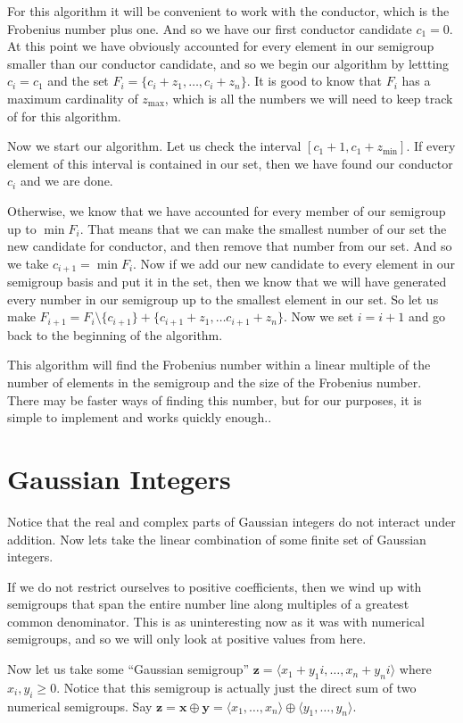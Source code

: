 \documentclass[11pt]{amsart}
\theoremstyle{plain}
\theoremstyle{definition}
\begin{document}
For this algorithm it will be convenient to work with the conductor, which is the Frobenius number plus one.
And so we have our first conductor candidate $c_1=0$.
At this point we have obviously accounted for every element in our semigroup smaller than our conductor candidate, and so we begin our algorithm by lettting $c_i=c_1$ and the set $F_i=\{c_i+z_1,\dots,c_i+z_n\}$.
It is good to know that $F_i$ has a maximum cardinality of $z_\text{max}$, which is all the numbers we will need to keep track of for this algorithm.

Now we start our algorithm.
Let us check the interval $[c_1+1,c_1+z_\text{min}]$.
If every element of this interval is contained in our set, then we have found our conductor $c_i$ and we are done.

Otherwise, we know that we have accounted for every member of our semigroup up to $\min F_i$. That means that we can make the smallest number of our set the new candidate for conductor, and then remove that number from our set. And so we take $c_{i+1}=\min F_i$. Now if we add our new candidate to every element in our semigroup basis and put it in the set, then we know that we will have generated every number in our semigroup up to the smallest element in our set. So let us make $F_{i+1}=F_i\setminus \{c_{i+1}\} + \{c_{i+1}+z_1,\dots c_{i+1}+z_n\}$. Now we set $i=i+1$ and go back to the beginning of the algorithm.

This algorithm will find the Frobenius number within a linear multiple of the number of elements in the semigroup and the size of the Frobenius number. There may be faster ways of finding this number, but for our purposes, it is simple to implement and works quickly enough.\cite{frobmask}.

\section{Gaussian Integers}
Notice that the real and complex parts of Gaussian integers do not interact under addition. Now lets take the linear combination of some finite set of Gaussian integers.

If we do not restrict ourselves to positive coefficients, then we wind up with semigroups that span the entire number line along multiples of a greatest common denominator. This is as uninteresting now as it was with numerical semigroups, and so we will only look at positive values from here.

Now let us take some ``Gaussian semigroup'' $\mathbf{z}=\langle x_1+y_1i,\dots,x_n+y_ni\rangle$ where $x_i,y_i\ge 0$. Notice that this semigroup is actually just the direct sum of two numerical semigroups. Say $\mathbf{z}=\mathbf{x}\oplus\mathbf{y}=\langle x_1,\dots,x_n\rangle\oplus\langle y_1,\dots,y_n\rangle$.
\end{document}
